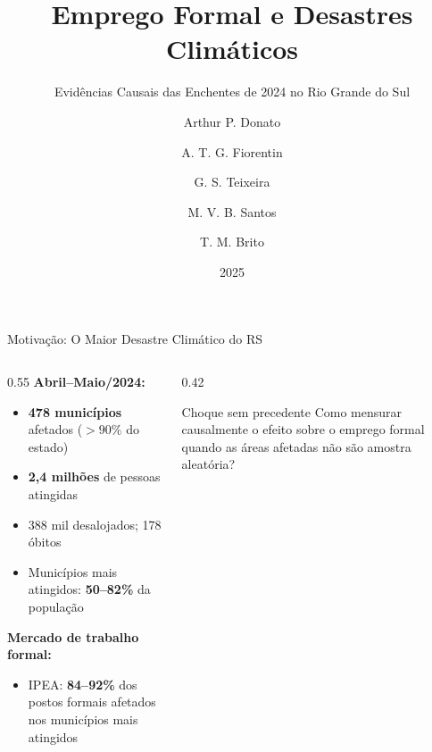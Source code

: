 \documentclass[11pt, aspectratio=169]{beamer}
\title{Emprego Formal e Desastres Climáticos}
\subtitle{Evidências Causais das Enchentes de 2024 no Rio Grande do Sul}
\author{Arthur P. Donato \and A. T. G. Fiorentin \and G. S. Teixeira \and M. V. B. Santos \and T. M. Brito}
\institute{PPGE -- Universidade Federal do Rio Grande (FURG)}
\date{2025}
\newcommand{\destaque}[1]{\textcolor{mred}{\textbf{#1}}}
\begin{document}
\maketitle

\begin{frame}[shrink=8]{Motivação: O Maior Desastre Climático do RS}

\begin{columns}[T]
\begin{column}{0.55\textwidth}
  \textbf{Abril--Maio/2024:}
  \begin{itemize}
    \item \destaque{478 municípios} afetados ($>90\%$ do estado)
    \item \destaque{2,4 milhões} de pessoas atingidas
    \item 388 mil desalojados; 178 óbitos
    \item Municípios mais atingidos: \destaque{50--82\%} da população
  \end{itemize}

  \medskip
  \textbf{Mercado de trabalho formal:}
  \begin{itemize}
    \item IPEA: \destaque{84--92\%} dos postos formais afetados nos municípios mais atingidos
  \end{itemize}
\end{column}
\begin{column}{0.42\textwidth}
  \begin{alertblock}{Choque sem precedente}
    Como mensurar causalmente o efeito sobre o emprego formal quando as áreas afetadas não são amostra aleatória?
  \end{alertblock}
\end{column}
\end{columns}

\end{frame}
\end{document}
